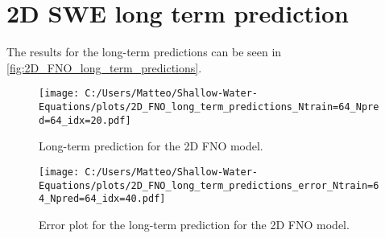 \section{2D SWE long term prediction}
The results for the long-term predictions can be seen in \autoref{fig:2D_FNO_long_term_predictions}.
\begin{figure}[H]
    \centering
    \texttt{[image: C:/Users/Matteo/Shallow-Water-Equations/plots/2D\_FNO\_long\_term\_predictions\_Ntrain=64\_Npred=64\_idx=20.pdf]}
    \caption{Long-term prediction for the 2D FNO model.}\label{fig:2D_FNO_long_term_predictions}
\end{figure}


\begin{figure}[H]
    \centering
    \texttt{[image: C:/Users/Matteo/Shallow-Water-Equations/plots/2D\_FNO\_long\_term\_predictions\_error\_Ntrain=64\_Npred=64\_idx=40.pdf]}
    \caption{Error plot for the long-term prediction for the 2D FNO model.}\label{fig:2D_FNO_long_term_error_40}
\end{figure}




